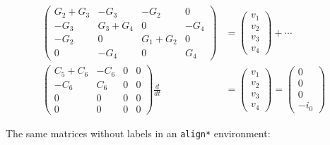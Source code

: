 \documentclass[%
oneside,                 %
final,                   %
10pt]{article}
\begin{document}
\begin{align}
\begin{pmatrix}
G_2 + G_3 & -G_3 & -G_2 & 0 \\ 
-G_3 & G_3 + G_4 & 0 & -G_4 \\ 
-G_2 & 0 & G_1 + G_2 & 0 \\ 
0 & -G_4 & 0 & G_4
\end{pmatrix}
&=
\begin{pmatrix}
v_1 \\ 
v_2 \\ 
v_3 \\ 
v_4
\end{pmatrix}
+ \cdots
\label{_mymatrixeq}\\ 
\begin{pmatrix}
C_5 + C_6 & -C_6 & 0 & 0 \\ 
-C_6 & C_6 & 0 & 0 \\ 
0 & 0 & 0 & 0 \\ 
0 & 0 & 0 & 0
\end{pmatrix}
\frac{d}{dt} &=
\begin{pmatrix}
v_1 \\ 
v_2 \\ 
v_3 \\ 
v_4
\end{pmatrix} =
\begin{pmatrix}
0 \\ 
0 \\ 
0 \\ 
-i_0
\end{pmatrix}
\end{align}

The same matrices without labels in an \texttt{align*} environment:
\end{document}
